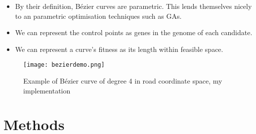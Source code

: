 \documentclass{beamer}
\begin{document}
\begin{frame}


    \begin{itemize}
        \item By their definition, Bézier curves are parametric. This lends themselves nicely to an parametric optimisation techniques such as GAs.
        \item We can represent the control points as genes in the genome of each candidate.
        \item We can represent a curve's fitness as its length within feasible space.
    \end{itemize}
\end{frame}

\begin{frame}
    \begin{figure}[htpb]
        \centering
        \texttt{[image: bezierdemo.png]}
        \caption{Example of Bézier curve of degree 4 in road coordinate space, my implementation}%
        \label{fig:bezierdemo}
    \end{figure}
\end{frame}

\section{Methods}
\end{document}
